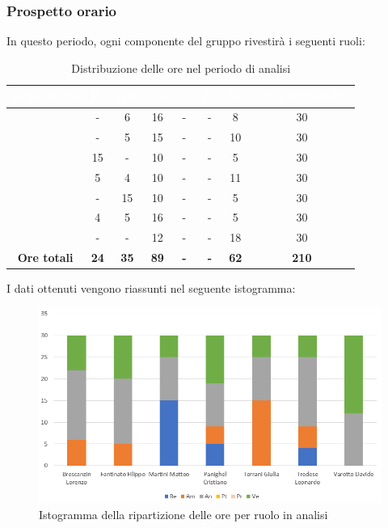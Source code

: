 \subsubsection{Prospetto orario}
In questo periodo, ogni componente del gruppo rivestirà i seguenti ruoli:
\begin{table}[H]
	\begin{center}
		\begin{tabular}{ |c c c c c c c c|}
		\rowcolor{darkblue} 
		\textcolor{white}{\textbf{Nominativo}} & \textcolor{white}{\textbf{Re}} & \textcolor{white}{\textbf{Am}} & \textcolor{white}{\textbf{An}} & \textcolor{white}{\textbf{Pt}} & \textcolor{white}{\textbf{Pr}} & \textcolor{white}{\textbf{Ve}} & \textcolor{white}{\textbf{Ore Complessive}}\\ \hline
		\BL 	& - 	& 6 	& 16 	& - 	& - 	& 8 	& 30 \\ \hline
		\FF 	& - 	& 5 	& 15 	& - 	& - 	& 10 	& 30 \\ \hline
		\MM		& 15	& - 	& 10 	& - 	& - 	& 5 	& 30 \\ \hline
		\PC		& 5 	& 4 	& 10 	& - 	& - 	& 11	& 30 \\ \hline
		\TG 	& - 	& 15	& 10 	& - 	& - 	& 5 	& 30 \\ \hline
		\TL 	& 4 	& 5 	& 16 	& - 	& - 	& 5 	& 30 \\ \hline
		\VD 	& - 	& -  	& 12 	& - 	& - 	& 18 	& 30 \\ \hline
		\textbf{Ore totali} & \textbf{24} & \textbf{35} & \textbf{89} & \textbf{-} & \textbf{-} & \textbf{62} & \textbf{210} \\ \hline
		\end{tabular}
	\caption{Distribuzione delle ore nel periodo di analisi}
	\end{center}
\end{table}
I dati ottenuti vengono riassunti nel seguente istogramma:
\begin{figure}[H]
    \centering
    \includegraphics[scale = 0.70]{Immagini/AnalisiIsto.png}
    \caption{Istogramma della ripartizione delle ore per ruolo in analisi}
    \label{fig:istogramma ripartizione ore, periodo di Analisi}
\end{figure}
\newpage
